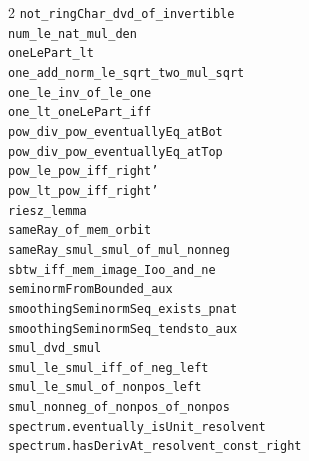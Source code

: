 \documentclass[10pt,a4paper]{article}
\begin{document}
\begin{multicols}{2}
\texttt{not\_ringChar\_dvd\_of\_invertible} \\
\texttt{num\_le\_nat\_mul\_den} \\
\texttt{oneLePart\_lt} \\
\texttt{one\_add\_norm\_le\_sqrt\_two\_mul\_sqrt} \\
\texttt{one\_le\_inv\_of\_le\_one} \\
\texttt{one\_lt\_oneLePart\_iff} \\
\texttt{pow\_div\_pow\_eventuallyEq\_atBot} \\
\texttt{pow\_div\_pow\_eventuallyEq\_atTop} \\
\texttt{pow\_le\_pow\_iff\_right'} \\
\texttt{pow\_lt\_pow\_iff\_right'} \\
\texttt{riesz\_lemma} \\
\texttt{sameRay\_of\_mem\_orbit} \\
\texttt{sameRay\_smul\_smul\_of\_mul\_nonneg} \\
\texttt{sbtw\_iff\_mem\_image\_Ioo\_and\_ne} \\
\texttt{seminormFromBounded\_aux} \\
\texttt{smoothingSeminormSeq\_exists\_pnat} \\
\texttt{smoothingSeminormSeq\_tendsto\_aux} \\
\texttt{smul\_dvd\_smul} \\
\texttt{smul\_le\_smul\_iff\_of\_neg\_left} \\
\texttt{smul\_le\_smul\_of\_nonpos\_left} \\
\texttt{smul\_nonneg\_of\_nonpos\_of\_nonpos} \\
\texttt{spectrum.\allowbreak{}eventually\_isUnit\_resolvent} \\
\texttt{spectrum.\allowbreak{}hasDerivAt\_resolvent\_const\_right} \\

\end{multicols}
\end{document}
